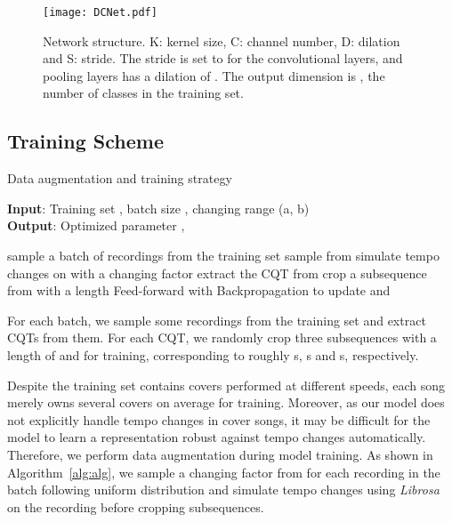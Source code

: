 \documentclass{article}
\newcommand{\algref}[1]{\mbox{Algorithm~\ref{#1}}}
\begin{document}
\begin{figure}[h]
    \centering
    \texttt{[image: DCNet.pdf]}
    \caption{Network structure. K: kernel size, C: channel number, D: dilation and S: stride. The stride is set to  for the convolutional layers, and pooling layers has a dilation of . The output dimension is , the number of classes in the training set.}
    \label{fig:net}
\end{figure}



\subsection{Training Scheme}

\begin{algorithm}[ht]
  \caption{Data augmentation and training strategy}
  \label{alg:alg}
  \textbf{Input}: Training set , batch size , changing range (a, b) \\
  \textbf{Output}: Optimized parameter , 
  \begin{algorithmic}[1]
  \REPEAT
  \FOR{\}}
  \STATE sample a batch of recordings  from the training set 
  \STATE 
  \FOR{}
  \STATE  sample from 
  \STATE  simulate tempo changes on  with a changing factor 
  \STATE  extract the CQT from 
  \STATE  crop a subsequence from  with a length 
  \STATE 
  \ENDFOR
  \STATE Feed-forward with 
  \STATE Backpropagation to update  and 
  \ENDFOR

  \end{algorithmic}
\end{algorithm}

For each batch, we sample some recordings from the training set and extract CQTs from them. For each CQT, we randomly crop three subsequences with a length of  and  for training, corresponding to roughly s, s and s, respectively. 

Despite the training set contains covers performed at different speeds, each song merely owns several covers on average for training. Moreover, as our model does not explicitly handle tempo changes in cover songs, it may be difficult for the model to learn a representation robust against tempo changes automatically. Therefore, we perform data augmentation during model training. As shown in \algref{alg:alg}, we sample a changing factor from  for each recording in the batch following uniform distribution and simulate tempo changes using \textit{Librosa} \cite{mcfee2015librosa} on the recording before cropping subsequences. 
\end{document}
